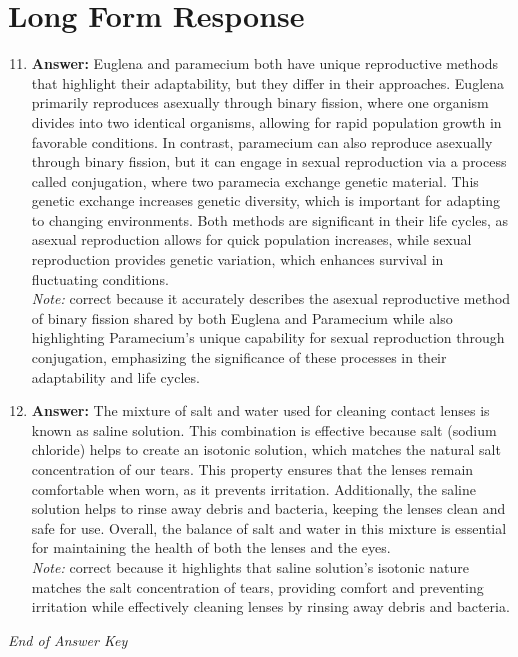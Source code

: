 \documentclass[12pt]{article}
\begin{document}
\section*{Long Form Response}
\begin{enumerate}[label=\arabic*.]
\setcounter{enumi}{10}
\item \textbf{Answer:} Euglena and paramecium both have unique reproductive methods that highlight their adaptability, but they differ in their approaches. Euglena primarily reproduces asexually through binary fission, where one organism divides into two identical organisms, allowing for rapid population growth in favorable conditions. In contrast, paramecium can also reproduce asexually through binary fission, but it can engage in sexual reproduction via a process called conjugation, where two paramecia exchange genetic material. This genetic exchange increases genetic diversity, which is important for adapting to changing environments. Both methods are significant in their life cycles, as asexual reproduction allows for quick population increases, while sexual reproduction provides genetic variation, which enhances survival in fluctuating conditions.
\\ \textit{Note:} correct because it accurately describes the asexual reproductive method of binary fission shared by both Euglena and Paramecium while also highlighting Paramecium's unique capability for sexual reproduction through conjugation, emphasizing the significance of these processes in their adaptability and life cycles.
\item \textbf{Answer:} The mixture of salt and water used for cleaning contact lenses is known as saline solution. This combination is effective because salt (sodium chloride) helps to create an isotonic solution, which matches the natural salt concentration of our tears. This property ensures that the lenses remain comfortable when worn, as it prevents irritation. Additionally, the saline solution helps to rinse away debris and bacteria, keeping the lenses clean and safe for use. Overall, the balance of salt and water in this mixture is essential for maintaining the health of both the lenses and the eyes.
\\ \textit{Note:} correct because it highlights that saline solution's isotonic nature matches the salt concentration of tears, providing comfort and preventing irritation while effectively cleaning lenses by rinsing away debris and bacteria.
\end{enumerate}

\vfill
\noindent\textit{End of Answer Key}
\end{document}
